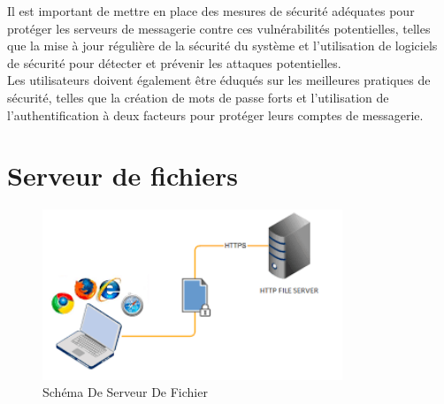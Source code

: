 Il est important de mettre en place des mesures de sécurité adéquates pour protéger les serveurs de messagerie contre ces vulnérabilités potentielles, telles que la mise à jour régulière de la sécurité du système et l'utilisation de logiciels de sécurité pour détecter et prévenir les attaques potentielles.\\
 Les utilisateurs doivent également être éduqués sur les meilleures pratiques de sécurité, telles que la création de mots de passe forts et l'utilisation de l'authentification à deux facteurs pour protéger leurs comptes de messagerie.\\
\section{Serveur de fichiers} 
	\begin{figure}[h]
		\begin{center}
		
	\includegraphics[width=0.8\textwidth]{PhotoMemoire/serveur_fichier.png}
\caption{Schéma De Serveur De Fichier\cite{7}}
\end{center}
\end{figure}
